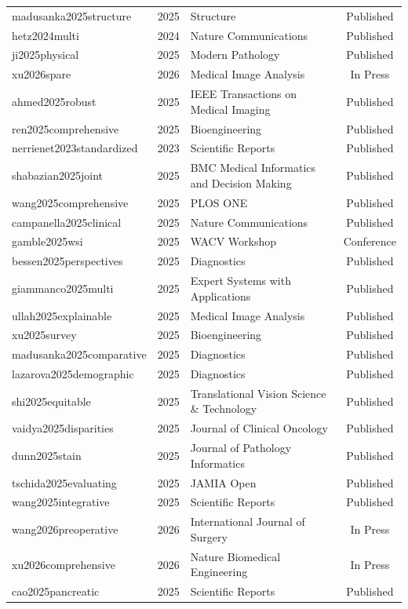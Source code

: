 \begin{table}[htbp]
\begin{tabularx}{\linewidth}{@{}l l X c@{}}
    madusanka2025structure & 2025 & Structure & Published \\
    hetz2024multi & 2024 & Nature Communications & Published \\
    ji2025physical & 2025 & Modern Pathology & Published \\
    xu2026spare & 2026 & Medical Image Analysis & In Press \\
    ahmed2025robust & 2025 & IEEE Transactions on Medical Imaging & Published \\
    ren2025comprehensive & 2025 & Bioengineering & Published \\
    nerrienet2023standardized & 2023 & Scientific Reports & Published \\
    shabazian2025joint & 2025 & BMC Medical Informatics and Decision Making & Published \\
    wang2025comprehensive & 2025 & PLOS ONE & Published \\
    campanella2025clinical & 2025 & Nature Communications & Published \\
    gamble2025wsi & 2025 & WACV Workshop & Conference \\
    bessen2025perspectives & 2025 & Diagnostics & Published \\
    giammanco2025multi & 2025 & Expert Systems with Applications & Published \\
    ullah2025explainable & 2025 & Medical Image Analysis & Published \\
    xu2025survey & 2025 & Bioengineering & Published \\
    madusanka2025comparative & 2025 & Diagnostics & Published \\
    lazarova2025demographic & 2025 & Diagnostics & Published \\
    shi2025equitable & 2025 & Translational Vision Science \& Technology & Published \\
    vaidya2025disparities & 2025 & Journal of Clinical Oncology & Published \\
    dunn2025stain & 2025 & Journal of Pathology Informatics & Published \\
    tschida2025evaluating & 2025 & JAMIA Open & Published \\
    wang2025integrative & 2025 & Scientific Reports & Published \\
    wang2026preoperative & 2026 & International Journal of Surgery & In Press \\
    xu2026comprehensive & 2026 & Nature Biomedical Engineering & In Press \\
    cao2025pancreatic & 2025 & Scientific Reports & Published \\
    \bottomrule
  \end{tabularx}
\end{table}

